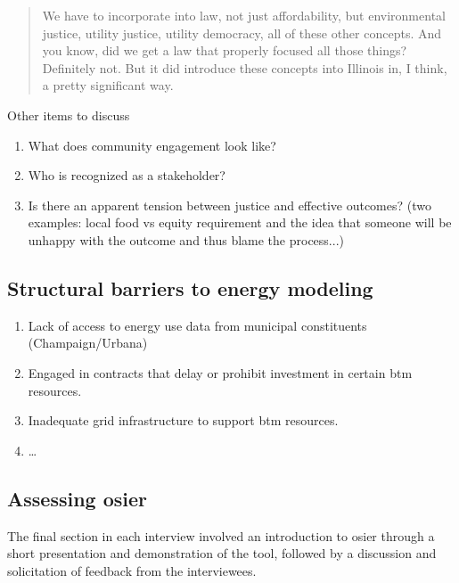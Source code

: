 \begin{quote}
    We have to incorporate into law, not just affordability, but environmental
    justice, utility justice, utility democracy, all of these other concepts.
    And you know, did we get a law that properly focused all those things?
    Definitely not. But it did introduce these concepts into Illinois in, I
    think, a pretty significant way.
\end{quote}

Other items to discuss
\begin{enumerate}
    \item What does community engagement look like?
    \item Who is recognized as a stakeholder?
    \item Is there an apparent tension between justice and effective outcomes?
    (two examples: local food vs equity requirement and the idea that someone
    will be unhappy with the outcome and thus blame the process...)
\end{enumerate}


\subsection{Structural barriers to energy modeling}

\begin{enumerate}
    \item Lack of access to energy use data from municipal constituents
    (Champaign/Urbana)
    \item Engaged in contracts that delay or prohibit investment in certain
    \ac{btm} resources.
    \item Inadequate grid infrastructure to support \ac{btm} resources.
    \item \dots
\end{enumerate}

\subsection{Assessing \ac{osier}} 

The final section in each interview involved an introduction to \ac{osier}
through a short presentation and demonstration of the tool, followed by a
discussion and solicitation of feedback from the interviewees. 

